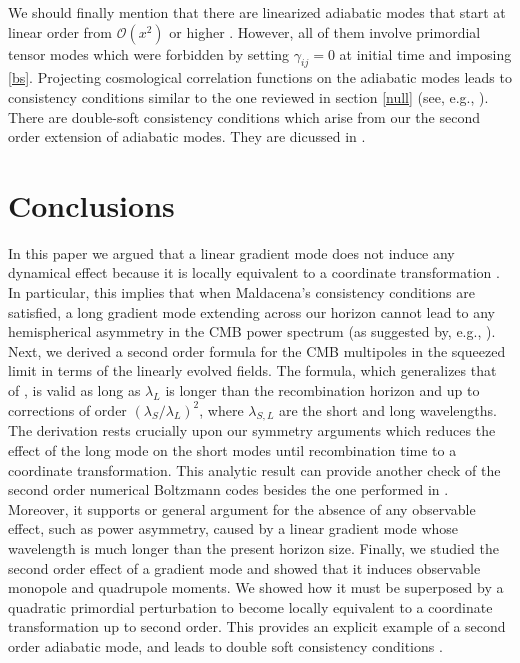 \documentclass[12pt]{article}
\numberwithin{equation}{section}
\newcommand{\mal}[1]{\mathcal #1}
\begin{document}
{We should finally mention that there are linearized adiabatic modes that start at linear order from $\mal O(x^2)$ or higher \cite{Hinterbichler}. However, all of them involve primordial tensor modes which were forbidden by setting $\gamma_{ij}=0$ at initial time and imposing \eqref{bs}. Projecting cosmological correlation functions on the adiabatic modes leads to consistency conditions similar to the one reviewed in section \ref{null} (see, e.g., \cite{Creminelli_sct,Hinterbichler_adia,Hinterbichler}). There are double-soft consistency conditions which arise from our the second order extension of adiabatic modes. They are dicussed in \cite{double_soft,Joyce}.

\section{Conclusions}

In this paper we argued that a linear gradient mode does not induce any dynamical effect because it is locally equivalent to a coordinate transformation \cite{Weinberg,Creminelli_sct}. In particular, this implies that when Maldacena's consistency conditions are satisfied, a long gradient mode extending across our horizon cannot lead to any hemispherical asymmetry in the CMB power spectrum (as suggested by, e.g., \cite{Erickcek}). Next, we derived a second order formula for the CMB multipoles in the squeezed limit in terms of the linearly evolved fields. The formula, which generalizes that of \cite{Creminelli_squeezed}, is valid as long as $\lambda_L$ is longer than the recombination horizon and up to corrections of order $(\lambda_S/\lambda_L)^2$, where $\lambda_{S,L}$ are the short and long wavelengths. The derivation rests crucially upon our symmetry arguments which reduces the effect of the long mode on the short modes until recombination time to a coordinate transformation. This analytic result can provide another check of the second order numerical Boltzmann codes besides the one performed in \cite{Creminelli_squeezed,Huang}. Moreover, it supports or general argument for the absence of any observable effect, such as power asymmetry, caused by a linear gradient mode whose wavelength is much longer than the present horizon size. Finally, we studied the second order effect of a gradient mode and showed that it induces observable monopole and quadrupole moments. We showed how it must be superposed by a quadratic primordial perturbation to become locally equivalent to a coordinate transformation up to second order. This provides an explicit example of a second order adiabatic mode, and leads to double soft consistency conditions \cite{double_soft,Joyce}.




}
\end{document}
